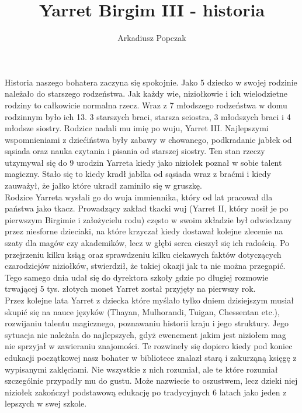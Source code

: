 \documentclass{article}
\title{Yarret Birgim III - historia}
\author{Arkadiusz Popczak}
\date{}
\begin{document}
    \maketitle

    Historia naszego bohatera zaczyna się spokojnie. Jako 5 dziecko w swojej rodzinie należało do starszego rodzeństwa. Jak każdy wie, niziołkowie i ich wielodzietne rodziny to całkowicie normalna rzecz. Wraz z 7 młodszego rodzeństwa w domu rodzinnym było ich 13. 3 starszych braci, starsza seiostra, 3 młodszych braci i 4 młodsze siostry. Rodzice nadali mu imię po wuju, Yarret III. Najlepszymi wspomnieniami z dziećiństwa były zabawy w chowanego, podkradanie jabłek od sąsiada oraz nauka czytania i pisania od starszej siostry. Ten stan rzeczy utzymywał się do 9 urodzin Yarreta kiedy jako niziołek poznał w sobie talent magiczny. Stało się to kiedy kradł jabłka od sąsiada wraz z braćmi i kiedy zauważył, że jałko które ukradł zaminiło się w gruszkę.\\

    Rodzice Yarreta wysłali go do wuja immiennika, który od lat pracował dla państwa jako tkacz. Prowadzący zakład tkacki wuj (Yarret II, który nosił je po pierwszym Birgimie i założycielu rodu) często w swoim zkładzie był odwiedzany przez niesforne dzieciaki, na które krzyczał kiedy dostawał kolejne zlecenie na szaty dla magów czy akademików, lecz w głębi serca cieszył się ich radością. Po przejrzeniu kilku ksiąg oraz sprawdzeniu kilku ciekawych faktów dotyczących czarodziejów niziołków, stwierdził, że takiej okazji jak ta nie można przegapić. Tego samego dnia udał się do dyrektora szkoły gdzie po długiej rozmowie trwającej 5 tys. złotych monet Yarret został przyjęty na pierwszy rok.\\

    Przez kolejne lata Yarret z dziecka które myślało tylko dniem dzisiejszym musiał skupić się na nauce języków (Thayan, Mulhorandi, Tuigan, Chessentan etc.), rozwijaniu talentu magicznego, poznawaniu historii kraju i jego struktury. Jego sytuacja nie należała do najlepszych, gdyż ewenement jakim jest niziołem mag nie sprzyjał w zawieraniu znajomości. Te rozwineły się dopiero kiedy pod koniec edukacji początkowej nasz bohater w bibliotece znalazł starą i zakurząną księgę z wypisanymi zaklęciami. Nie wszystkie z nich rozumiał, ale te które rozumiał szczególnie przypadły mu do gustu. Może nazwiecie to oszustwem, lecz dzieki niej niziołek zakończył podstawową edukację po tradycyjnych 6 latach jako jeden z lepszych w swej szkole.\\
\end{document}
